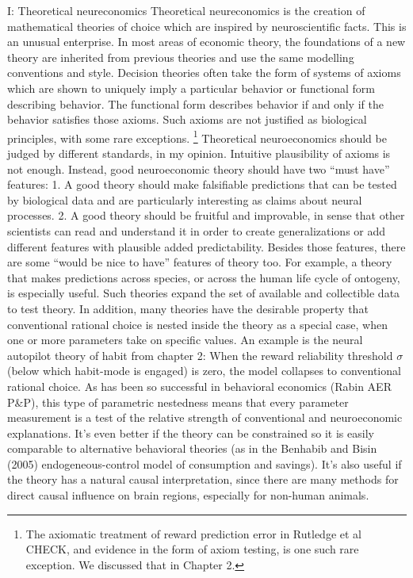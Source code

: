 \documentclass{article}
\begin{document}
I:  Theoretical neureconomics
Theoretical neureconomics is the creation of mathematical theories of choice which are inspired by neuroscientific facts. This is an unusual enterprise. In most areas of economic theory, the foundations of a new theory are inherited from previous theories and use the same modelling conventions and style. Decision theories often take the form of systems of axioms which are shown to uniquely imply a particular behavior or functional form describing behavior. The functional form describes behavior if and only if the behavior satisfies those axioms. Such axioms are not justified as biological principles, with some rare exceptions. \footnote{The axiomatic treatment of reward prediction error in Rutledge et al CHECK, and evidence in the form of axiom testing, is one such rare exception. We discussed that in Chapter 2.}
Theoretical neuroeconomics should be judged by different standards, in my opinion. Intuitive plausibility of axioms is not enough. Instead, good neuroeconomic theory should have two “must have” features:
1.	A good theory should make falsifiable predictions that can be tested by biological data and are particularly interesting as claims about neural processes. 
2.	A good theory should be fruitful and improvable, in sense that other scientists can read and understand it in order to create generalizations or add different features with plausible added predictability.  
Besides those features, there are some “would be nice to have” features of theory too. For example, a theory that makes predictions across species, or across the human life cycle of ontogeny, is especially useful. Such theories expand the set of available and collectible data to test theory.
In addition, many theories have the desirable property that conventional rational choice is nested inside the theory as a special case, when one or more parameters take on specific values. An example is the neural autopilot theory of habit from chapter 2: When the reward reliability threshold $\sigma$ (below which habit-mode is engaged) is zero, the model collapses to conventional rational choice. As has been so successful in behavioral economics (Rabin AER P\&P), this type of parametric nestedness means that every parameter measurement is a test of the relative strength of conventional and neuroeconomic explanations. 
It’s even better if the theory can be constrained so it is easily comparable to alternative behavioral theories (as in the Benhabib and Bisin (2005) endogeneous-control model of consumption and savings). It’s also useful if the theory has a natural causal interpretation, since there are many methods for direct causal influence on brain regions, especially for non-human animals. 
\end{document}
